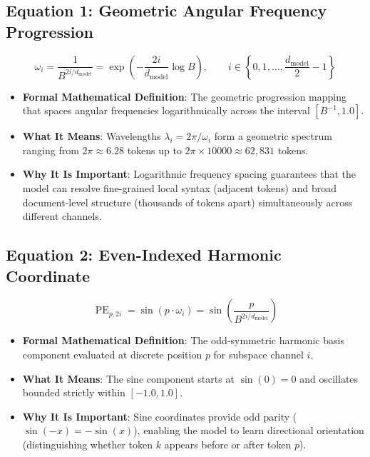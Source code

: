 \documentclass[11pt,a4paper]{article}
\theoremstyle{definition}
\begin{document}
\subsection{\textbf{Equation 1: Geometric Angular Frequency Progression}}
{\boldmath
\begin{equation}
\omega_i = \frac{1}{B^{2i / d_{\text{model}}}} = \exp\left( -\frac{2i}{d_{\text{model}}} \log B \right), \qquad i \in \left\{0, 1, \dots, \frac{d_{\text{model}}}{2} - 1\right\}
\end{equation}
}
\begin{itemize}
    \item \textbf{Formal Mathematical Definition}:
    The geometric progression mapping that spaces angular frequencies logarithmically across the interval $[B^{-1}, 1.0]$.
    \item \textbf{What It Means}:
    Wavelengths $\lambda_i = 2\pi / \omega_i$ form a geometric spectrum ranging from $2\pi \approx 6.28$ tokens up to $2\pi \times 10000 \approx 62,831$ tokens.
    \item \textbf{Why It Is Important}:
    Logarithmic frequency spacing guarantees that the model can resolve fine-grained local syntax (adjacent tokens) and broad document-level structure (thousands of tokens apart) simultaneously across different channels.
\end{itemize}

\subsection{\textbf{Equation 2: Even-Indexed Harmonic Coordinate}}
{\boldmath
\begin{equation}
\operatorname{PE}_{p, 2i} = \sin(p \cdot \omega_i) = \sin\left(\frac{p}{B^{2i / d_{\text{model}}}}\right)
\end{equation}
}
\begin{itemize}
    \item \textbf{Formal Mathematical Definition}:
    The odd-symmetric harmonic basis component evaluated at discrete position $p$ for subspace channel $i$.
    \item \textbf{What It Means}:
    The sine component starts at $\sin(0) = 0$ and oscillates bounded strictly within $[-1.0, 1.0]$.
    \item \textbf{Why It Is Important}:
    Sine coordinates provide odd parity ($\sin(-x) = -\sin(x)$), enabling the model to learn directional orientation (distinguishing whether token $k$ appears before or after token $p$).
\end{itemize}
\end{document}
